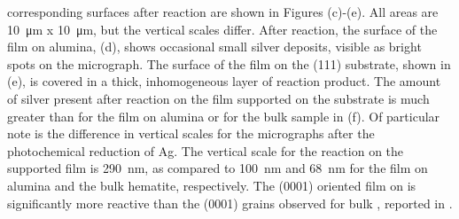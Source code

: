 corresponding surfaces after reaction are shown in Figures
(c)-(e). All areas are \SI{10}{\micro\meter} x
\SI{10}{\micro\meter}, but the vertical scales differ. After reaction, the surface of the
film on alumina, (d), shows occasional small silver deposits,
visible as bright spots on the micrograph.  The surface of the film on the
(111) substrate, shown in (e), is covered in a
thick, inhomogeneous layer of reaction product.  The amount of silver present after
reaction on the film supported on the  substrate is much greater than for the
film on alumina or for the bulk sample in (f).  Of particular
note is the difference in vertical scales for the micrographs after the photochemical
reduction of Ag.  The vertical scale for the reaction on the  supported film is
\SI{290}{\nano\meter}, as compared to \SI{100}{\nano\meter} and \SI{68}{\nano\meter} for
the film on alumina and the bulk hematite, respectively. The (0001) oriented film on
 is significantly more reactive than the (0001) grains observed for bulk
, reported in .

